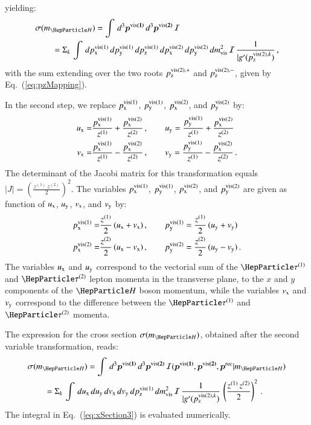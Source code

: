 yielding:
\begin{align}
& \sigma(m_{\PHiggs}) =
\int \, d^{3}\bm{p^{\vis(1)}} \, d^{3}\bm{p^{\vis(2)}} \, \mathcal{I} \nonumber \\
& \qquad 
 = \Sigma_{k} \, \int \, d\pX^{\vis(1)} \, d\pY^{\vis(1)} \,
d\pZ^{\vis(1)} \, d\pX^{\vis(2)} \, d\pY^{\vis(2)} \, dm_{\vis}^{2} \,
\mathcal{I} \, \frac{1}{\vert g'(p_{\textrm{z}}^{\vis(2),k})} \, ,
\label{eq:xSection2}
\end{align}
with the sum extending over the two roots $p_{\textrm{z}}^{\textrm{vis}(2),+}$
and $p_{\textrm{z}}^{\textrm{vis}(2),-}$, given by Eq.~(\ref{eq:pzMapping}).

In the second step,
we replace $p_{\textrm{x}}^{\textrm{vis}(1)}$, $p_{\textrm{y}}^{\textrm{vis}(1)}$, $p_{\textrm{x}}^{\textrm{vis}(2)}$, and $p_{\textrm{y}}^{\textrm{vis}(2)}$ by:
\begin{align}
u_{\textrm{x}} = & \frac{p_{\textrm{x}}^{\textrm{vis}(1)}}{z^{(1)}} +
\frac{p_{\textrm{x}}^{\textrm{vis}(2)}}{z^{(2)}} \, , \qquad
  u_{\textrm{y}} = \frac{p_{\textrm{y}}^{\textrm{vis}(1)}}{z^{(1)}} + \frac{p_{\textrm{x}}^{\textrm{vis}(2)}}{z^{(2)}} \nonumber \\
v_{\textrm{x}} = & \frac{p_{\textrm{x}}^{\textrm{vis}(1)}}{z^{(1)}} -
\frac{p_{\textrm{x}}^{\textrm{vis}(2)}}{z^{(2)}} \, , \qquad
  v_{\textrm{y}} = \frac{p_{\textrm{y}}^{\textrm{vis}(1)}}{z^{(1)}} - \frac{p_{\textrm{x}}^{\textrm{vis}(2)}}{z^{(2)}} \, .
\label{eq:varTransform_uX_uY_vX_vY}
\end{align}
The determinant of the Jacobi matrix for this transformation equals $\vert J \vert = \left( \frac{z^{(1)} \, z^{(2)}}{2} \right)^{2}$.
The variables $p_{\textrm{x}}^{\textrm{vis}(1)}$, $p_{\textrm{y}}^{\textrm{vis}(1)}$, $p_{\textrm{x}}^{\textrm{vis}(2)}$, and $p_{\textrm{y}}^{\textrm{vis}(2)}$ are given 
as function of $u_{\textrm{x}}$, $u_{\textrm{y}}$, $v_{\textrm{x}}$, and $v_{\textrm{y}}$ by:
\begin{align}
p_{\textrm{x}}^{\textrm{vis}(1)} = & \frac{z^{(1)}}{2} \, ( u_{\textrm{x}} + v_{\textrm{x}} ) \, , \qquad
  p_{\textrm{y}}^{\textrm{vis}(1)} = \frac{z^{(1)}}{2} \, ( u_{\textrm{y}} + v_{\textrm{y}} ) \nonumber \\
p_{\textrm{x}}^{\textrm{vis}(2)} = & \frac{z^{(2)}}{2} \, ( u_{\textrm{x}} - v_{\textrm{x}} ) \, , \qquad
  p_{\textrm{y}}^{\textrm{vis}(2)} = \frac{z^{(2)}}{2} \, ( u_{\textrm{y}} - v_{\textrm{y}} ) \, . 
\label{eq:varTransform_uX_uY_vX_vY_inverse}
\end{align}
The variables $u_{\textrm{x}}$ and $u_{\textrm{y}}$ correspond to the vectorial sum of the $\Pgt^{(1)}$ and $\Pgt^{(2)}$ lepton momenta in the transverse plane,
\ie to the $x$ and $y$ components of the $\PHiggs$ boson momentum,
while the variables $v_{\textrm{x}}$ and $v_{\textrm{y}}$ correspond to the difference
between the $\Pgt^{(1)}$ and $\Pgt^{(2)}$ momenta.

The expression for the cross section $\sigma(m_{\PHiggs})$, obtained after the second variable transformation, reads:
\begin{align}
& \sigma(m_{\PHiggs}) =
\int \, d^{3}\bm{p^{\vis(1)}} \, d^{3}\bm{p^{\vis(2)}} \,
\mathcal{I}(\bm{p^{\vis(1)}},\bm{p^{\vis(2)}},\bm{p^{\rec}}|m_{\PHiggs})
\nonumber \\
& \qquad
  = \Sigma_{k} \, \int \, d\uX \, d\uY \, d\vX \, d\vY \, d\pZ^{\vis(1)}
\, dm_{\vis}^{2} \, \mathcal{I} \, \frac{1}{\vert g'(p_{\textrm{z}}^{\vis(2),k})} \, \left( \frac{z^{(1)} \, z^{(2)}}{2} \right)^{2} \, .
\label{eq:xSection3}
\end{align}
The integral in Eq.~(\ref{eq:xSection3}) is evaluated numerically.


